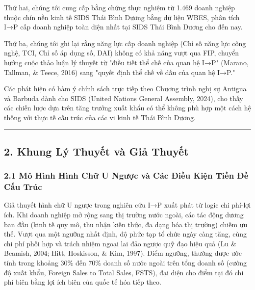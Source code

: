 \documentclass[12pt,a4paper]{article}
\begin{document}
Thứ hai, chúng tôi cung cấp bằng chứng thực nghiệm từ 1.469 doanh nghiệp
thuộc chín nền kinh tế SIDS Thái Bình Dương bằng dữ liệu WBES, phân tích
I→P cấp doanh nghiệp toàn diện nhất tại SIDS Thái Bình Dương cho đến
nay.

Thứ ba, chúng tôi ghi lại rằng năng lực cấp doanh nghiệp (Chỉ số năng
lực công nghệ, TCI, Chỉ số áp dụng số, DAI) không có khả năng vượt qua
FIP, chuyển hướng cuộc thảo luận lý thuyết từ "điều tiết thể chế của
quan hệ I→P" (Marano, Tallman, \& Teece, 2016) sang "quyết định thể chế
về dấu của quan hệ I→P."

Các phát hiện có hàm ý chính sách trực tiếp theo Chương trình nghị sự
Antigua và Barbuda dành cho SIDS (United Nations General Assembly,
2024), cho thấy các chiến lược dựa trên tăng trưởng xuất khẩu có thể
không phù hợp một cách hệ thống với thực tế cấu trúc của các vi kinh tế
Thái Bình Dương.

\begin{center}\rule{0.5\linewidth}{0.5pt}\end{center}

\hypertarget{2-khung-luxfd-thuyux1ebft-vuxe0-giux1ea3-thuyux1ebft}{%
\subsection{2. Khung Lý Thuyết và Giả
Thuyết}\label{2-khung-luxfd-thuyux1ebft-vuxe0-giux1ea3-thuyux1ebft}}

\hypertarget{21-muxf4-huxecnh-huxecnh-chux1eef-u-ngux1b0ux1ee3c-vuxe0-cuxe1c-ux111iux1ec1u-kiux1ec7n-tiux1ec1n-ux111ux1ec1-cux1ea5u-truxfac}{%
\subsubsection{2.1 Mô Hình Hình Chữ U Ngược và Các Điều Kiện Tiền Đề Cấu
Trúc}\label{21-muxf4-huxecnh-huxecnh-chux1eef-u-ngux1b0ux1ee3c-vuxe0-cuxe1c-ux111iux1ec1u-kiux1ec7n-tiux1ec1n-ux111ux1ec1-cux1ea5u-truxfac}}

Giả thuyết hình chữ U ngược trong nghiên cứu I→P xuất phát từ logic chi
phí-lợi ích. Khi doanh nghiệp mở rộng sang thị trường nước ngoài, các
tác động dương ban đầu (kinh tế quy mô, thu nhận kiến thức, đa dạng hóa
thị trường) chiếm ưu thế. Vượt qua một ngưỡng nhất định, độ phức tạp tổ
chức ngày càng tăng, cùng chi phí phối hợp và trách nhiệm ngoại lai đảo
ngược quỹ đạo hiệu quả (Lu \& Beamish, 2004; Hitt, Hoskisson, \& Kim,
1997). Điểm ngưỡng, thường được ước tính trong khoảng 30\% đến 70\%
doanh số nước ngoài trên tổng doanh số (cường độ xuất khẩu, Foreign
Sales to Total Sales, FSTS), đại diện cho điểm tại đó chi phí biên bằng
lợi ích biên của quốc tế hóa tiếp theo.
\end{document}
